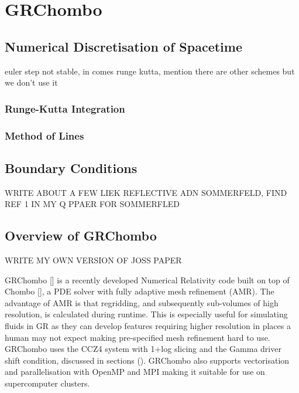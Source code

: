 





\section{GRChombo}

\subsection{Numerical Discretisation of Spacetime}

euler step not stable, in comes runge kutta, mention there are other schemes but we don't use it

\subsubsection{Runge-Kutta Integration}

\subsubsection{Method of Lines}

\subsection{Boundary Conditions}

WRITE ABOUT A FEW LIEK REFLECTIVE ADN SOMMERFELD, FIND REF 1 IN MY Q PPAER FOR SOMMERFLED

\subsection{Overview of GRChombo}


WRITE MY OWN VERSION OF JOSS PAPER


GRChombo [] is a recently developed Numerical Relativity code built on top of Chombo [], a PDE solver with fully adaptive mesh refinement (AMR). The advantage of AMR is that regridding, and subsequently sub-volumes of high resolution, is calculated during runtime. This is especially useful for simulating fluids in GR as they can develop features requiring higher resolution in places a human may not expect making pre-specified mesh refinement hard to use. GRChombo uses the CCZ4 system with 1+log slicing and the Gamma driver shift condition, discussed in sections (). GRChombo also supports vectorisation and parallelisation with OpenMP and MPI making it suitable for use on supercomputer clusters. 

